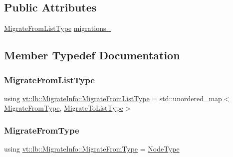 \subsection*{Public Attributes}
\begin{DoxyCompactItemize}
\item 
\hyperlink{structvt_1_1lb_1_1_migrate_info_ae62aede65465176ae319e0460b6cb5d7}{Migrate\+From\+List\+Type} \hyperlink{structvt_1_1lb_1_1_migrate_info_a2ae34d58ae8b7e0d353c790fceed7395}{migrations\+\_\+}
\end{DoxyCompactItemize}


\subsection{Member Typedef Documentation}
\mbox{\label{structvt_1_1lb_1_1_migrate_info_ae62aede65465176ae319e0460b6cb5d7}} 
\subsubsection{\texorpdfstring{Migrate\+From\+List\+Type}{MigrateFromListType}}
{\footnotesize\ttfamily using \hyperlink{structvt_1_1lb_1_1_migrate_info_ae62aede65465176ae319e0460b6cb5d7}{vt\+::lb\+::\+Migrate\+Info\+::\+Migrate\+From\+List\+Type} =  std\+::unordered\+\_\+map$<$\hyperlink{structvt_1_1lb_1_1_migrate_info_af2a075cd0219d4ff08758dbb6168d289}{Migrate\+From\+Type}, \hyperlink{structvt_1_1lb_1_1_migrate_info_a849f608488ac05ab0942c1543933fa4d}{Migrate\+To\+List\+Type}$>$}

\mbox{\label{structvt_1_1lb_1_1_migrate_info_af2a075cd0219d4ff08758dbb6168d289}} 
\subsubsection{\texorpdfstring{Migrate\+From\+Type}{MigrateFromType}}
{\footnotesize\ttfamily using \hyperlink{structvt_1_1lb_1_1_migrate_info_af2a075cd0219d4ff08758dbb6168d289}{vt\+::lb\+::\+Migrate\+Info\+::\+Migrate\+From\+Type} =  \hyperlink{namespacevt_a866da9d0efc19c0a1ce79e9e492f47e2}{Node\+Type}}

